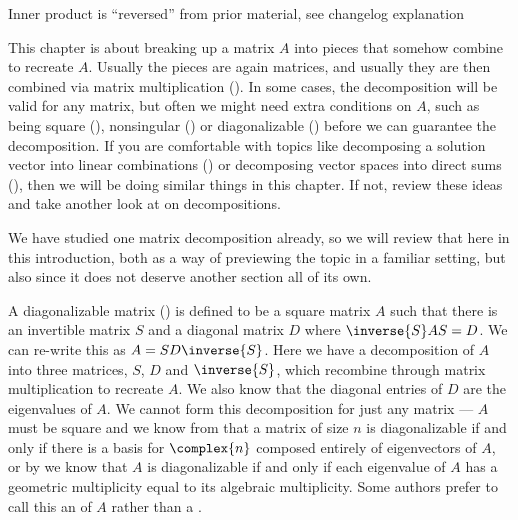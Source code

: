 %
\begin{para}{\sc\large Inner product is ``reversed'' from prior material, see changelog explanation}\end{para}
%
\begin{para}This chapter is about breaking up a matrix $A$ into pieces that somehow combine to recreate $A$.  Usually the pieces are again matrices, and usually they are then combined via matrix multiplication ().  In some cases, the decomposition will be valid for any matrix, but often we might need extra conditions on $A$, such as being square (), nonsingular () or diagonalizable () before we can guarantee the decomposition.  If you are comfortable with topics like decomposing a solution vector into linear combinations () or decomposing vector spaces into direct sums (), then we will be doing similar things in this chapter.  If not, review these ideas and take another look at  on decompositions.\end{para}
%
\begin{para}We have studied one matrix decomposition already, so we will review that here in this introduction, both as a way of previewing the topic in a familiar setting, but also since it does not deserve another section all of its own.\end{para}
%
\begin{para}A diagonalizable matrix () is defined to be a square matrix $A$ such that there is an invertible matrix $S$ and a diagonal matrix $D$ where $\inverse{S}AS=D$.  We can re-write this as $A=SD\inverse{S}$.   Here we have a decomposition of $A$ into three matrices, $S$, $D$ and $\inverse{S}$, which recombine through matrix multiplication to recreate $A$.  We also know that the diagonal entries of $D$ are the eigenvalues of $A$.  We cannot form this decomposition for just any matrix --- $A$ must be square and we know from  that a matrix of size $n$ is diagonalizable if and only if there is a basis for $\complex{n}$ composed entirely of eigenvectors of $A$, or by  we know that $A$ is diagonalizable if and only if each eigenvalue of $A$ has a geometric multiplicity equal to its algebraic multiplicity.  Some authors prefer to call this an  of $A$ rather than a .\end{para}
